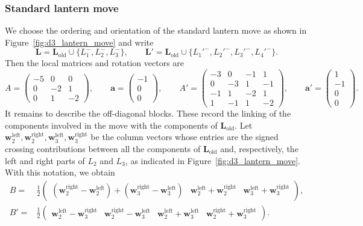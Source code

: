 \documentclass{amsart}
\numberwithin{equation}{section}
\numberwithin{figure}{section}
\theoremstyle{definition}
\theoremstyle{remark}
\begin{document}
\subsubsection*{Standard lantern move} We choose the ordering and orientation of the standard lantern move as shown in Figure~\ref{fig:d3_lantern_move} and write
\[
\boldsymbol L
=
\boldsymbol L_{\mathrm{old}}
\cup
\{L_1^-,L_2^-,L_3^-\},
\qquad
\boldsymbol L'
=
\boldsymbol L_{\mathrm{old}}
\cup
\{L_1'^-,L_2'^-,L_3'^-,L_4'^-\}.
\]
Then the local matrices and rotation vectors are
\[
A=
\begin{pmatrix}
-5&0&0\\
0&-2&1\\
0&1&-2
\end{pmatrix},
\qquad
\boldsymbol a=
\begin{pmatrix}
-1\\
0\\
0
\end{pmatrix},
\qquad
A'=
\begin{pmatrix}
-3&0&-1&1\\
0&-3&1&-1\\
-1&1&-2&1\\
1&-1&1&-2
\end{pmatrix},
\qquad
\boldsymbol a'=
\begin{pmatrix}
1\\
-1\\
0\\
0
\end{pmatrix}.
\]
It remains to describe the off-diagonal blocks. These record the linking
of the components involved in the move with the components of
\(\boldsymbol L_{\mathrm{old}}\). Let $\boldsymbol w_2^{\mathrm{left}}, \boldsymbol w_2^{\mathrm{right}}, \boldsymbol w_3^{\mathrm{left}}, \boldsymbol w_3^{\mathrm{right}}$
be the column vectors whose entries are the signed crossing contributions
between all the components of \(\boldsymbol L_{\mathrm{old}}\) and, respectively,
the left and right parts of \(L_2\) and \(L_3\), as indicated in
Figure~\ref{fig:d3_lantern_move}. With this notation, we obtain
\begin{align*}
    B=&
\frac12
\begin{pmatrix}
(\boldsymbol w_2^{\mathrm{right}}-\boldsymbol w_2^{\mathrm{left}})
+
(\boldsymbol w_3^{\mathrm{right}}-\boldsymbol w_3^{\mathrm{left}})
&
\boldsymbol w_2^{\mathrm{left}}+\boldsymbol w_2^{\mathrm{right}}
&
\boldsymbol w_3^{\mathrm{left}}+\boldsymbol w_3^{\mathrm{right}}
\end{pmatrix},\\
B'=&
\frac12
\begin{pmatrix}
\boldsymbol w_2^{\mathrm{left}}-\boldsymbol w_3^{\mathrm{right}}
&
\boldsymbol w_2^{\mathrm{right}}-\boldsymbol w_3^{\mathrm{left}}
&
\boldsymbol w_2^{\mathrm{left}}+\boldsymbol w_3^{\mathrm{left}}
&
\boldsymbol w_2^{\mathrm{right}}+\boldsymbol w_3^{\mathrm{right}}
\end{pmatrix}.
\end{align*}
\end{document}
